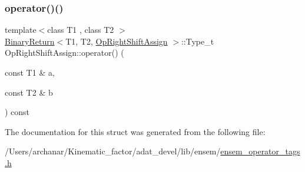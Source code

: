 \mbox{\label{structOpRightShiftAssign_aadcc045ee32dcfceb41c254bec68ef3c}} 
\subsubsection{\texorpdfstring{operator()()}{operator()()}\hspace{0.1cm}{\footnotesize\ttfamily [2/2]}}
{\footnotesize\ttfamily template$<$class T1 , class T2 $>$ \\
\mbox{\hyperlink{structBinaryReturn}{Binary\+Return}}$<$T1, T2, \mbox{\hyperlink{structOpRightShiftAssign}{Op\+Right\+Shift\+Assign}} $>$\+::Type\+\_\+t Op\+Right\+Shift\+Assign\+::operator() (\begin{DoxyParamCaption}\item[{const T1 \&}]{a,  }\item[{const T2 \&}]{b }\end{DoxyParamCaption}) const\hspace{0.3cm}{\ttfamily [inline]}}



The documentation for this struct was generated from the following file\+:\begin{DoxyCompactItemize}
\item 
/\+Users/archanar/\+Kinematic\+\_\+factor/adat\+\_\+devel/lib/ensem/\mbox{\hyperlink{lib_2ensem_2ensem__operator__tags_8h}{ensem\+\_\+operator\+\_\+tags.\+h}}\end{DoxyCompactItemize}
